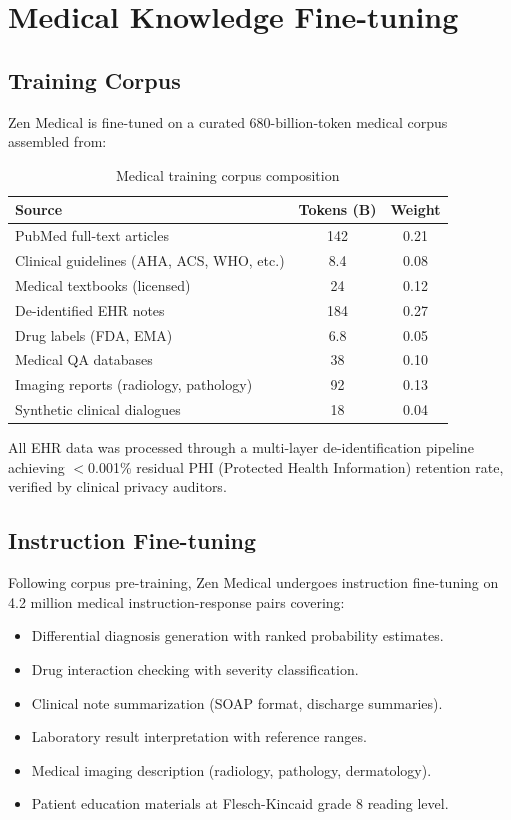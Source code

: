 \documentclass[11pt,a4paper]{article}
\begin{document}
\section{Medical Knowledge Fine-tuning}

\subsection{Training Corpus}

Zen Medical is fine-tuned on a curated 680-billion-token medical corpus assembled from:

\begin{table}[H]
\centering
\caption{Medical training corpus composition}
\label{tab:corpus}
\begin{tabular}{lcc}
\toprule
Source & Tokens (B) & Weight \\
\midrule
PubMed full-text articles & 142 & 0.21 \\
Clinical guidelines (AHA, ACS, WHO, etc.) & 8.4 & 0.08 \\
Medical textbooks (licensed) & 24 & 0.12 \\
De-identified EHR notes & 184 & 0.27 \\
Drug labels (FDA, EMA) & 6.8 & 0.05 \\
Medical QA databases & 38 & 0.10 \\
Imaging reports (radiology, pathology) & 92 & 0.13 \\
Synthetic clinical dialogues & 18 & 0.04 \\
\bottomrule
\end{tabular}
\end{table}

All EHR data was processed through a multi-layer de-identification pipeline achieving $<$0.001\% residual PHI (Protected Health Information) retention rate, verified by clinical privacy auditors.

\subsection{Instruction Fine-tuning}

Following corpus pre-training, Zen Medical undergoes instruction fine-tuning on 4.2 million medical instruction-response pairs covering:

\begin{itemize}
  \item Differential diagnosis generation with ranked probability estimates.
  \item Drug interaction checking with severity classification.
  \item Clinical note summarization (SOAP format, discharge summaries).
  \item Laboratory result interpretation with reference ranges.
  \item Medical imaging description (radiology, pathology, dermatology).
  \item Patient education materials at Flesch-Kincaid grade 8 reading level.
\end{itemize}
\end{document}
